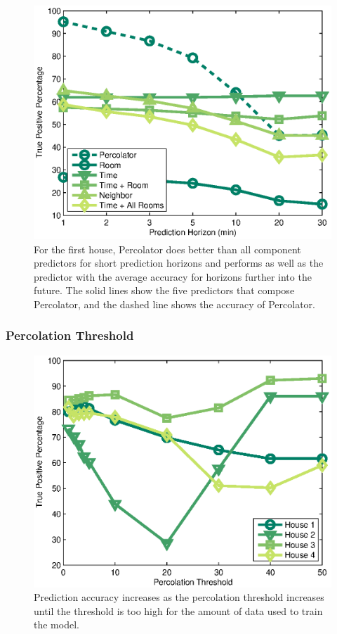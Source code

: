 \begin{figure}[!htb]
\begin{center}
\includegraphics[width=0.6\columnwidth]{fig/predictionHorizonModelType.eps}
\end{center}
\caption[Effect of increasing prediction horizon on occupancy predictors]{For
the first house, Percolator does better than all component predictors for short
prediction horizons and performs as well as the predictor with the average
accuracy for horizons further into the future. The solid lines show the five
predictors that compose Percolator, and the dashed line shows the accuracy of
Percolator.}
\label{fig:predictionHorizonModelType}
\end{figure}

\subsubsection{Percolation Threshold}

\begin{figure}[!htb]
\begin{center}
\includegraphics[width=0.6\columnwidth]{fig/percolationThreshold4Houses.eps}
\end{center}
\caption[Sensitivity of Percolator to the percolation threshold]{Prediction
accuracy increases as the percolation threshold increases until the threshold is
too high for the amount of data used to train the model.}
\label{fig:percolationThreshold}
\end{figure}

